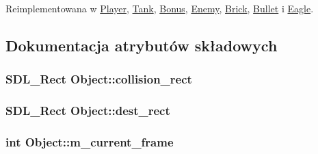Reimplementowana w \hyperlink{class_player_af5cac4f8c62903d39c7dc7bdf8f05ddb}{Player}, \hyperlink{class_tank_a1278dfec0f2d1d3bb1f4ce0a19957c0f}{Tank}, \hyperlink{class_bonus_a53c7235c0dae0deddfc95a2b7c5a594b}{Bonus}, \hyperlink{class_enemy_a03c09cab6c4950e4cae880c15b2fd739}{Enemy}, \hyperlink{class_brick_a31098851b4f1224cfd6b51c4ef47094f}{Brick}, \hyperlink{class_bullet_a28c27c103a23f73d18125791c973cccd}{Bullet} i \hyperlink{class_eagle_a609e173a641783b14973d5e1055f192a}{Eagle}.



\subsection{Dokumentacja atrybutów składowych}
\hypertarget{class_object_a308c5fde145e854d4a2808283f18e14b}{}
\subsubsection[{collision\+\_\+rect}]{\setlength{\rightskip}{0pt plus 5cm}S\+D\+L\+\_\+\+Rect Object\+::collision\+\_\+rect}\label{class_object_a308c5fde145e854d4a2808283f18e14b}
\hypertarget{class_object_aa11a2e0ccb927f542aee786bc7bd731d}{}
\subsubsection[{dest\+\_\+rect}]{\setlength{\rightskip}{0pt plus 5cm}S\+D\+L\+\_\+\+Rect Object\+::dest\+\_\+rect}\label{class_object_aa11a2e0ccb927f542aee786bc7bd731d}
\hypertarget{class_object_a4e03c944bc9142a5c34b7049c20c4301}{}
\subsubsection[{m\+\_\+current\+\_\+frame}]{\setlength{\rightskip}{0pt plus 5cm}int Object\+::m\+\_\+current\+\_\+frame\hspace{0.3cm}{\ttfamily [protected]}}\label{class_object_a4e03c944bc9142a5c34b7049c20c4301}
\hypertarget{class_object_a76a3f8ee17746de53b8f162b5df2c837}{}
